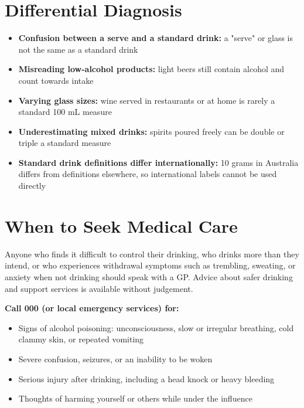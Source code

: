 \section*{Differential Diagnosis}
\begin{itemize}
    \item \textbf{Confusion between a serve and a standard drink:} a "serve" or glass is not the same as a standard drink
    \item \textbf{Misreading low-alcohol products:} light beers still contain alcohol and count towards intake
    \item \textbf{Varying glass sizes:} wine served in restaurants or at home is rarely a standard 100 mL measure
    \item \textbf{Underestimating mixed drinks:} spirits poured freely can be double or triple a standard measure
    \item \textbf{Standard drink definitions differ internationally:} 10 grams in Australia differs from definitions elsewhere, so international labels cannot be used directly
\end{itemize}

\section*{When to Seek Medical Care}
Anyone who finds it difficult to control their drinking, who drinks more than they intend, or who experiences withdrawal symptoms such as trembling, sweating, or anxiety when not drinking should speak with a GP. Advice about safer drinking and support services is available without judgement.

\textbf{Call 000 (or local emergency services) for:}
\begin{itemize}
    \item Signs of alcohol poisoning: unconsciousness, slow or irregular breathing, cold clammy skin, or repeated vomiting
    \item Severe confusion, seizures, or an inability to be woken
    \item Serious injury after drinking, including a head knock or heavy bleeding
    \item Thoughts of harming yourself or others while under the influence
\end{itemize}


